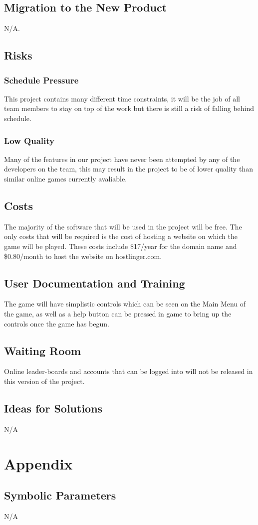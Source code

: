 \documentclass[12pt, titlepage]{article}
\begin{document}
\subsection{Migration to the New Product}
N/A.

\subsection{Risks}

\subsubsection{Schedule Pressure}

This project contains many different time constraints, it will be the job of all team members to stay on top of the work but there is still a risk of falling behind schedule.

\subsubsection{Low Quality}

Many of the features in our project have never been attempted by any of the developers on the team, this may result in the project to be of lower quality than similar online games currently avaliable.

\subsection{Costs}

The majority of the software that will be used in the project will be free. The only costs that will be required is the cost of hosting a website on which the game will be played. These costs include \$17/year for the domain name and \$0.80/month to host the website on hostlinger.com.

\subsection{User Documentation and Training}

The game will have simplistic controls which can be seen on the Main Menu of the game, as well as a help button can be pressed in game to bring up the controls once the game has begun.

\subsection{Waiting Room}

Online leader-boards and accounts that can be logged into will not be released in this version of the project.

\subsection{Ideas for Solutions}
N/A





\newpage

\section{Appendix}

\subsection{Symbolic Parameters}

N/A
\end{document}
